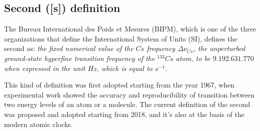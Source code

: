 \subsection{Second ([s]) definition}
\label{subsec:second_definition}

The Bureau International des Poids et Mesures (BIPM), which is one of the three organizations that define the International System of Units (SI), defines the second as: \textit{the fixed numerical value of the $Cs$ frequency $\Delta \nu_{Cs}$, the unperturbed ground-state hyperfine transition frequency of the $^{133}Cs$ atom, to be $9.192.631.770$ when expressed in the unit $Hz$, which is equal to $s^{-1}$.}

This kind of definition was first adopted starting from the year 1967, when experimental work showed the accuracy and reproducibility of transition between two energy levels of an atom or a molecule.
The current definition of the second was proposed and adopted starting from 2018, and it's also at the basis of the modern atomic clocks.


